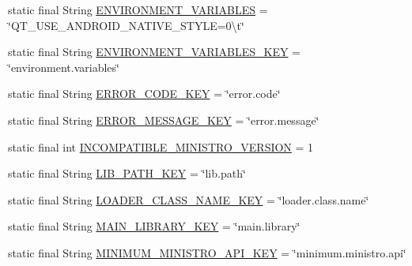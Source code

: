 \begin{DoxyCompactItemize}
\item 
static final String \hyperlink{classorg_1_1qtproject_1_1qt5_1_1android_1_1bindings_1_1_qt_activity_ad15ba0bd0c50fec1a278b9e8df99a696}{E\-N\-V\-I\-R\-O\-N\-M\-E\-N\-T\-\_\-\-V\-A\-R\-I\-A\-B\-L\-E\-S} = \char`\"{}Q\-T\-\_\-\-U\-S\-E\-\_\-\-A\-N\-D\-R\-O\-I\-D\-\_\-\-N\-A\-T\-I\-V\-E\-\_\-\-S\-T\-Y\-L\-E=0\textbackslash{}t\char`\"{}
\item 
static final String \hyperlink{classorg_1_1qtproject_1_1qt5_1_1android_1_1bindings_1_1_qt_activity_a0ab4c9114f2c7fc3d558b434b94ca67d}{E\-N\-V\-I\-R\-O\-N\-M\-E\-N\-T\-\_\-\-V\-A\-R\-I\-A\-B\-L\-E\-S\-\_\-\-K\-E\-Y} = \char`\"{}environment.\-variables\char`\"{}
\item 
static final String \hyperlink{classorg_1_1qtproject_1_1qt5_1_1android_1_1bindings_1_1_qt_activity_a622fb5d7bef50ed00fffc6bbd2360471}{E\-R\-R\-O\-R\-\_\-\-C\-O\-D\-E\-\_\-\-K\-E\-Y} = \char`\"{}error.\-code\char`\"{}
\item 
static final String \hyperlink{classorg_1_1qtproject_1_1qt5_1_1android_1_1bindings_1_1_qt_activity_aca95fb0dcd299571b85b640343ed93cb}{E\-R\-R\-O\-R\-\_\-\-M\-E\-S\-S\-A\-G\-E\-\_\-\-K\-E\-Y} = \char`\"{}error.\-message\char`\"{}
\item 
static final int \hyperlink{classorg_1_1qtproject_1_1qt5_1_1android_1_1bindings_1_1_qt_activity_a5289c3884e015f388f7d02893cacc9e1}{I\-N\-C\-O\-M\-P\-A\-T\-I\-B\-L\-E\-\_\-\-M\-I\-N\-I\-S\-T\-R\-O\-\_\-\-V\-E\-R\-S\-I\-O\-N} = 1
\item 
static final String \hyperlink{classorg_1_1qtproject_1_1qt5_1_1android_1_1bindings_1_1_qt_activity_a5358dabbb2ba8b009dbe44c7edcc4456}{L\-I\-B\-\_\-\-P\-A\-T\-H\-\_\-\-K\-E\-Y} = \char`\"{}lib.\-path\char`\"{}
\item 
static final String \hyperlink{classorg_1_1qtproject_1_1qt5_1_1android_1_1bindings_1_1_qt_activity_addbda8603e3918a0c8cb3031e1629edd}{L\-O\-A\-D\-E\-R\-\_\-\-C\-L\-A\-S\-S\-\_\-\-N\-A\-M\-E\-\_\-\-K\-E\-Y} = \char`\"{}loader.\-class.\-name\char`\"{}
\item 
static final String \hyperlink{classorg_1_1qtproject_1_1qt5_1_1android_1_1bindings_1_1_qt_activity_a26a671584c763cc53820a168f2148705}{M\-A\-I\-N\-\_\-\-L\-I\-B\-R\-A\-R\-Y\-\_\-\-K\-E\-Y} = \char`\"{}main.\-library\char`\"{}
\item 
static final String \hyperlink{classorg_1_1qtproject_1_1qt5_1_1android_1_1bindings_1_1_qt_activity_ab771969e61a69b9ac3108af0e02a6037}{M\-I\-N\-I\-M\-U\-M\-\_\-\-M\-I\-N\-I\-S\-T\-R\-O\-\_\-\-A\-P\-I\-\_\-\-K\-E\-Y} = \char`\"{}minimum.\-ministro.\-api\char`\"{}

\end{DoxyCompactItemize}
